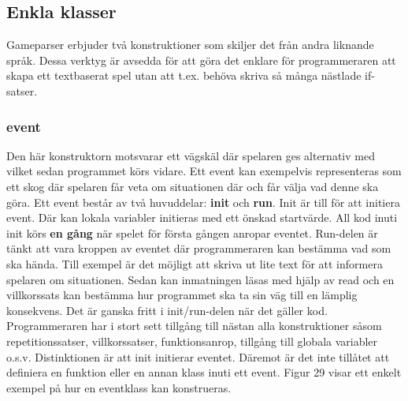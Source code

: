 \documentclass{Dokumentmall}
\begin{document}
\subsection{Enkla klasser}
Gameparser erbjuder två konstruktioner som skiljer det från andra liknande språk. Dessa verktyg är avsedda för att göra det enklare för programmeraren att skapa ett textbaserat spel utan att t.ex. behöva skriva så många nästlade if-satser.

\subsubsection{event}
Den här konstruktorn motsvarar ett vägskäl där spelaren ges alternativ med vilket sedan programmet körs vidare. Ett event kan exempelvis representeras som ett skog där spelaren får veta om situationen där och får välja vad denne ska göra. Ett event består av två huvuddelar: \textbf{init} och \textbf{run}. Init är till för att initiera event. Där kan lokala variabler initieras med ett önskad startvärde. All kod inuti init körs \textbf{en gång} när spelet för första gången anropar eventet. Run-delen är tänkt att vara kroppen av eventet där programmeraren kan bestämma vad som ska hända. Till exempel är det möjligt att skriva ut lite text för att informera spelaren om situationen. Sedan kan inmatningen läsas med hjälp av read och en villkorssats kan bestämma hur programmet ska ta sin väg till en lämplig konsekvens.
Det är ganska fritt i init/run-delen när det gäller kod. Programmeraren har i stort sett tillgång till nästan alla konstruktioner såsom repetitionssatser, villkorssatser, funktionsanrop, tillgång till globala variabler o.s.v. Distinktionen är att init initierar eventet. Däremot är det inte tillåtet att definiera en funktion eller en annan klass inuti ett event. Figur 29 visar ett enkelt exempel på hur en eventklass kan konstrueras.
\end{document}
